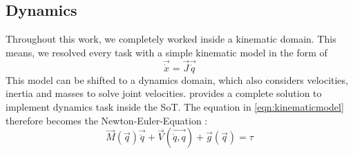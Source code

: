 \subsection*{Dynamics}
Throughout this work, we completely worked inside a kinematic domain. This means, we resolved every task with a simple kinematic model in the form of 
\begin{equation}\label{eqn:kinematicmodel}
\vec{\dot{x}} = \vec{J}\vec{\dot{q}}
\end{equation}
This model can be shifted to a dynamics domain, which also considers velocities, inertia and masses to solve joint velocities. \cite{oscar} provides a complete solution to implement dynamics task inside the SoT. The equation in \ref{eqn:kinematicmodel} therefore becomes the Newton-Euler-Equation \cite{dynamics}:
\begin{equation}
\vec{M}(\vec{q}) \vec{\ddot{q}} + \vec{V}(\vec{\dot{q},q}) + \vec{g}(\vec{q}) = \tau
\end{equation}